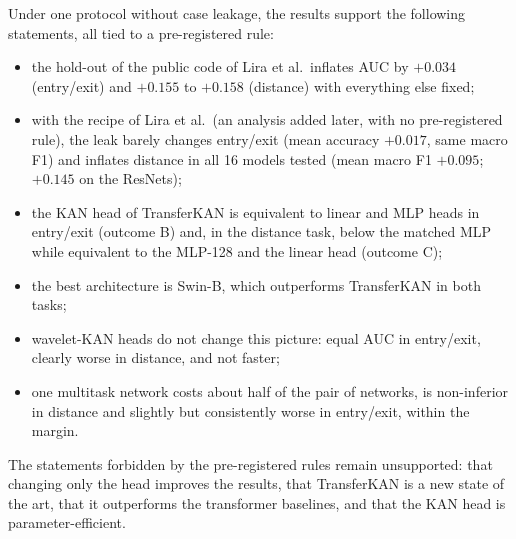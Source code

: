 Under one protocol without case leakage, the results support the following statements, all tied to a pre-registered rule:
\begin{itemize}
    \item the hold-out of the public code of Lira et al.\ inflates AUC by $+0.034$ (entry/exit) and $+0.155$ to $+0.158$ (distance) with everything else fixed;
    \item with the recipe of Lira et al.\ (an analysis added later, with no pre-registered rule), the leak barely changes entry/exit (mean accuracy $+0.017$, same macro F1) and inflates distance in all 16 models tested (mean macro F1 $+0.095$; $+0.145$ on the ResNets);
    \item the KAN head of TransferKAN is equivalent to linear and MLP heads in entry/exit (outcome B) and, in the distance task, below the matched MLP while equivalent to the MLP-128 and the linear head (outcome C);
    \item the best architecture is Swin-B, which outperforms TransferKAN in both tasks;
    \item wavelet-KAN heads do not change this picture: equal AUC in entry/exit, clearly worse in distance, and not faster;
    \item one multitask network costs about half of the pair of networks, is non-inferior in distance and slightly but consistently worse in entry/exit, within the margin.
\end{itemize}
The statements forbidden by the pre-registered rules remain unsupported: that changing only the head improves the results, that TransferKAN is a new state of the art, that it outperforms the transformer baselines, and that the KAN head is parameter-efficient.
